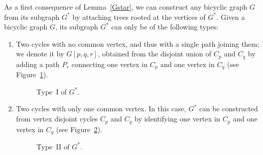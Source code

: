 \documentclass[a4paper,12pt]{amsart}
\theoremstyle{remark}
\begin{document}
As a first consequence of Lemma~\ref{Gstar}, we can construct any bicyclic graph $G$ from its subgraph $G^*$ by attaching trees rooted at the vertices of $G^*$. Given a bicyclic graph $G$, its subgraph $G^*$ can only be of the following types:
\begin{enumerate}
\item [{\bf Type~I}:] Two cycles with no common vertex, and thus with a single path joining them; we denote it by $G[p,q,r]$, obtained from the disjoint union of $C_p$ and $C_q$ by adding a path $P_r$ connecting one vertex in $C_p$ and one vertex in $C_q$ (see Figure~\ref{fig:TypeI}).
\begin{figure}[h]
	\begin{center}
	\end{center}
	\caption{Type~I of $G^*$.} \label{fig:TypeI}
\end{figure}
\medskip
\item [{\bf Type~II}:] Two cycles with only one common vertex. In this case, $G^*$ can be constructed from vertex disjoint cycles $C_p$ and $C_q$ by identifying one vertex in $C_p$ and one vertex in $C_q$ (see Figure~\ref{fig:TypeII}).
\begin{figure}[h]
	\begin{center}
	\end{center}
	\caption{Type~II of $G^*$.} \label{fig:TypeII}
\end{figure}

\end{enumerate}
\end{document}
